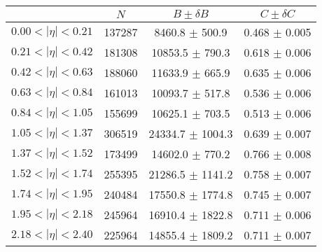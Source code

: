 \begin{tabular}{lccc}
\hline
    &   $N$   & $B \pm \delta B$  &  $C \pm \delta C$ \\
\hline
$0.00 < |\eta| <0.21$          & 137287     & 8460.8     $\pm$ 500.9 & 0.468      $\pm$ 0.005 \\
$0.21 < |\eta| <0.42$          & 181308     & 10853.5    $\pm$ 790.3 & 0.618      $\pm$ 0.006 \\
$0.42 < |\eta| <0.63$          & 188060     & 11633.9    $\pm$ 665.9 & 0.635      $\pm$ 0.006 \\
$0.63 < |\eta| <0.84$          & 161013     & 10093.7    $\pm$ 517.8 & 0.536      $\pm$ 0.006 \\
$0.84 < |\eta| <1.05$          & 155699     & 10625.1    $\pm$ 703.5 & 0.513      $\pm$ 0.006 \\
$1.05 < |\eta| <1.37$          & 306519     & 24334.7    $\pm$ 1004.3 & 0.639      $\pm$ 0.007 \\
$1.37 < |\eta| <1.52$          & 173499     & 14602.0    $\pm$ 770.2 & 0.766      $\pm$ 0.008 \\
$1.52 < |\eta| <1.74$          & 255395     & 21286.5    $\pm$ 1141.2 & 0.758      $\pm$ 0.007 \\
$1.74 < |\eta| <1.95$          & 240484     & 17550.8    $\pm$ 1774.8 & 0.745      $\pm$ 0.007 \\
$1.95 < |\eta| <2.18$          & 245964     & 16910.4    $\pm$ 1822.8 & 0.711      $\pm$ 0.006 \\
$2.18 < |\eta| <2.40$          & 225964     & 14855.4    $\pm$ 1809.2 & 0.711      $\pm$ 0.007 \\
\hline
\end{tabular}
